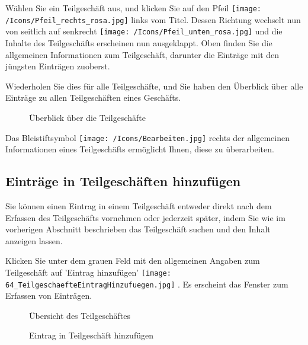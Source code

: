 Wählen Sie ein Teilgeschäft aus, und klicken Sie auf den Pfeil \texttt{[image: /Icons/Pfeil\_rechts\_rosa.jpg]} links vom Titel. Dessen Richtung wechselt nun von seitlich auf senkrecht \texttt{[image: /Icons/Pfeil\_unten\_rosa.jpg]} und die Inhalte des Teilgeschäfts erscheinen nun ausgeklappt. Oben finden Sie die allgemeinen Informationen zum Teilgeschäft, darunter die Einträge mit den jüngsten Einträgen zuoberst.

\vspace{\baselineskip}

Wiederholen Sie dies für alle Teilgeschäfte, und Sie haben den Überblick über alle Einträge zu allen Teilgeschäften eines Geschäfts.

\begin{figure}[H]
\caption{Überblick über die Teilgeschäfte}
\end{figure}

Das Bleistiftsymbol \texttt{[image: /Icons/Bearbeiten.jpg]}  rechts der allgemeinen Informationen eines Teilgeschäfts ermöglicht Ihnen, diese zu überarbeiten.

\subsection{Einträge in Teilgeschäften hinzufügen}

Sie können einen Eintrag in einem Teilgeschäft entweder direkt nach dem Erfassen des Teilgeschäfts vornehmen oder jederzeit später, indem Sie wie im vorherigen Abschnitt beschrieben das Teilgeschäft suchen und den Inhalt anzeigen lassen.

Klicken Sie unter dem grauen Feld mit den allgemeinen Angaben zum Teilgeschäft auf 'Eintrag hinzufügen' \texttt{[image: 64\_TeilgeschaefteEintragHinzufuegen.jpg]} . Es erscheint das Fenster zum Erfassen von Einträgen.

\begin{figure}[H]
\caption{Übersicht des Teilgeschäftes}
\end{figure}

\begin{figure}[H]
\caption{Eintrag in Teilgeschäft hinzufügen}
\end{figure}

